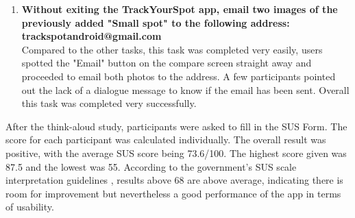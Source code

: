 \begin{enumerate}
    \item \textbf{Without exiting the TrackYourSpot app, email two images of the previously added "Small spot" to the following address: trackspotandroid@gmail.com}
    \\ Compared to the other tasks, this task was completed very easily, users spotted the "Email" button on the compare screen straight away and proceeded to email both photos to the address. A few participants pointed out the lack of a dialogue message to know if the email has been sent. Overall this task was completed very successfully.
\end{enumerate}

After the think-aloud study, participants were asked to fill in the SUS Form. The score for each participant was calculated individually. The overall result was positive, with the average SUS score being 73.6/100. The highest score given was 87.5 and the lowest was 55. According to the government's SUS scale interpretation guidelines \cite{affairs_2013}, results above 68 are above average, indicating there is room for improvement but nevertheless a good performance of the app in terms of usability.

